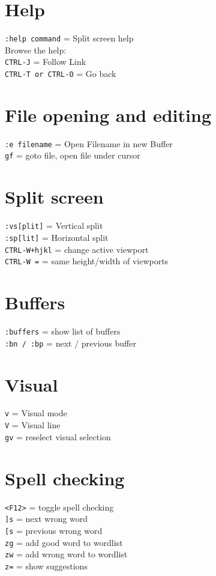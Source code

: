 \documentclass[10pt,DIV=50,landscape,pagesize,parskip=off]{scrartcl}
\newcommand\co[1]{\texttt{#1}}
\newcommand\coe[2]{\co{#1} = #2}
\begin{document}
\begin{multicols}{3}
\section{Help}
\coe{:help command}{Split screen help}\\
Browse the help:\\
\coe{CTRL-J}{Follow Link}\\
\coe{CTRL-T or CTRL-O}{Go back}

\section{File opening and editing}
\coe{:e filename}{Open Filename in new Buffer}\\
\coe{gf}{goto file, open file under cursor}

\section{Split screen}
\coe{:vs[plit]}{Vertical split}\\
\coe{:sp[lit]}{Horizontal split}\\
\coe{CTRL-W+hjkl}{change active viewport}\\
\coe{CTRL-W =}{same height/width of viewports}

\section{Buffers}
\coe{:buffers}{show list of buffers}\\
\coe{:bn / :bp}{next / previous buffer}

\section{Visual}
\coe{v}{Visual mode}\\
\coe{V}{Visual line}\\
\coe{gv}{reselect visual selection}

\section{Spell checking}
\coe{<F12>}{toggle spell checking}\\
\coe{]s}{next wrong word}\\
\coe{[s}{previous wrong word}\\
\coe{zg}{add good word to wordlist}\\
\coe{zw}{add wrong word to wordlist}\\
\coe{z=}{show suggestions}


\end{multicols}
\end{document}
